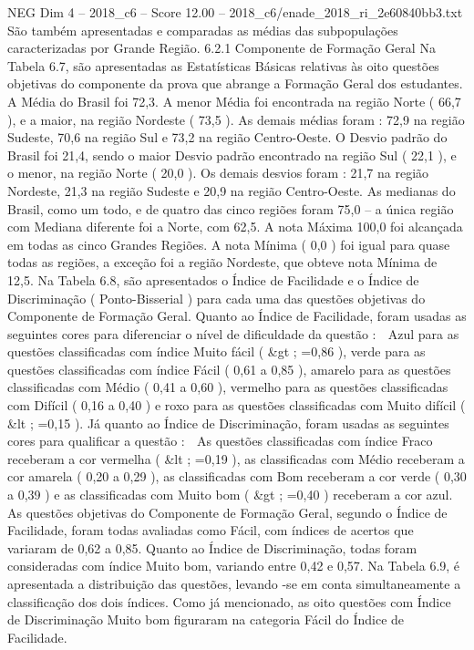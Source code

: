 \begin{textsample}{NEG Dim 4 – 2018\_c6 – Score 12.00 – 2018\_c6/enade\_2018\_ri\_2e60840bb3.txt}
São também apresentadas e comparadas as médias das subpopulações caracterizadas por Grande Região. 6.2.1 Componente de Formação Geral Na Tabela 6.7, são apresentadas as Estatísticas Básicas relativas às oito questões objetivas do componente da prova que abrange a Formação Geral dos estudantes.
A Média do Brasil foi 72,3.
A menor Média foi encontrada na região Norte ( 66,7 ), e a maior, na região Nordeste ( 73,5 ).
As demais médias foram : 72,9 na região Sudeste, 70,6 na região Sul e 73,2 na região Centro-Oeste.
O Desvio padrão do Brasil foi 21,4, sendo o maior Desvio padrão encontrado na região Sul ( 22,1 ), e o menor, na região Norte ( 20,0 ).
Os demais desvios foram : 21,7 na região Nordeste, 21,3 na região Sudeste e 20,9 na região Centro-Oeste.
As medianas do Brasil, como um todo, e de quatro das cinco regiões foram 75,0 – a única região com Mediana diferente foi a Norte, com 62,5.
A nota Máxima 100,0 foi alcançada em todas as cinco Grandes Regiões.
A nota Mínima ( 0,0 ) foi igual para quase todas as regiões, a exceção foi a região Nordeste, que obteve nota Mínima de 12,5.
Na Tabela 6.8, são apresentados o Índice de Facilidade e o Índice de Discriminação ( Ponto-Bisserial ) para cada uma das questões objetivas do Componente de Formação Geral.
Quanto ao Índice de Facilidade, foram usadas as seguintes cores para diferenciar o nível de dificuldade da questão :  Azul para as questões classificadas com índice Muito fácil ( \&gt ; =0,86 ), verde para as questões classificadas com índice Fácil ( 0,61 a 0,85 ), amarelo para as questões classificadas com Médio ( 0,41 a 0,60 ), vermelho para as questões classificadas com Difícil ( 0,16 a 0,40 ) e roxo para as questões classificadas com Muito difícil ( \&lt ; =0,15 ).
Já quanto ao Índice de Discriminação, foram usadas as seguintes cores para qualificar a questão :  As questões classificadas com índice Fraco receberam a cor vermelha ( \&lt ; =0,19 ), as classificadas com Médio receberam a cor amarela ( 0,20 a 0,29 ), as classificadas com Bom receberam a cor verde ( 0,30 a 0,39 ) e as classificadas com Muito bom ( \&gt ; =0,40 ) receberam a cor azul.
As questões objetivas do Componente de Formação Geral, segundo o Índice de Facilidade, foram todas avaliadas como Fácil, com índices de acertos que variaram de 0,62 a 0,85.
Quanto ao Índice de Discriminação, todas foram consideradas com índice Muito bom, variando entre 0,42 e 0,57.
Na Tabela 6.9, é apresentada a distribuição das questões, levando -se em conta simultaneamente a classificação dos dois índices.
Como já mencionado, as oito questões com Índice de Discriminação Muito bom figuraram na categoria Fácil do Índice de Facilidade.

\end{textsample}
